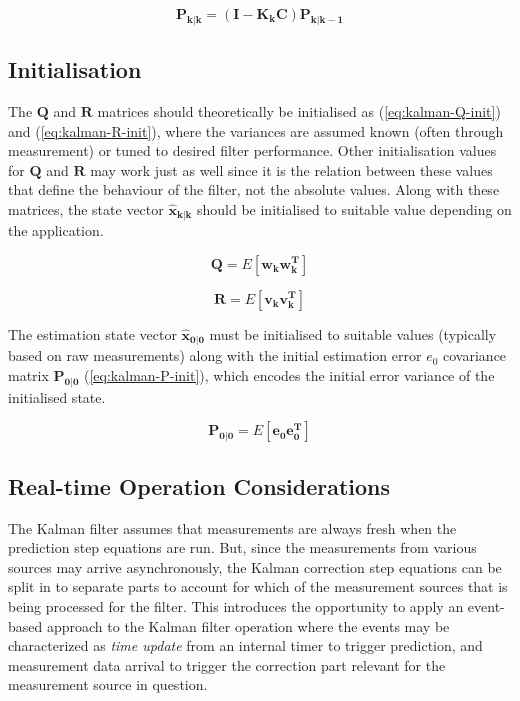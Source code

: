 \documentclass[a4paper]{report}
\begin{document}
\begin{equation}
\mathbf{P_{k|k}} = \mathbf{(I-K_k C) P_{k|k-1}}
\label{eq:kalman-cov-upd-corr}
\end{equation}

	\subsection{Initialisation}

The $\mathbf{Q}$ and $\mathbf{R}$ matrices should theoretically be initialised as (\ref{eq:kalman-Q-init}) and (\ref{eq:kalman-R-init}), where the variances are assumed known (often through measurement) or tuned to desired filter performance. Other initialisation values for $\mathbf{Q}$ and $\mathbf{R}$ may work just as well since it is the relation between these values that define the behaviour of the filter, not the absolute values. Along with these matrices, the state vector $\mathbf{\hat{x}_{k|k}}$ should be initialised to suitable value depending on the application.

\begin{equation}
\mathbf{Q} = E[\mathbf{w_k w_k^T}]
\label{eq:kalman-Q-init}
\end{equation}

\begin{equation}
\mathbf{R} = E[\mathbf{v_k v_k^T}]
\label{eq:kalman-R-init}
\end{equation}

The estimation state vector $\mathbf{\hat{x}_{0|0}}$ must be initialised to suitable values (typically based on raw measurements) along with the initial estimation error $e_0$ covariance matrix $\mathbf{P_{0|0}}$ (\ref{eq:kalman-P-init}), which encodes the initial error variance of the initialised state.

\begin{equation}
\mathbf{P_{0|0}} = E[\mathbf{e_0 e_0^T}]
\label{eq:kalman-P-init}
\end{equation}

	\subsection{Real-time Operation Considerations}

The Kalman filter assumes that measurements are always fresh when the prediction step equations are run. But, since the measurements from various sources may arrive asynchronously, the Kalman correction step equations can be split in to separate parts to account for which of the measurement sources that is being processed for the filter. This introduces the opportunity to apply an event-based approach to the Kalman filter operation where the events may be characterized as \emph{time update} from an internal timer to trigger prediction, and measurement data arrival to trigger the correction part relevant for the measurement source in question.
\end{document}
